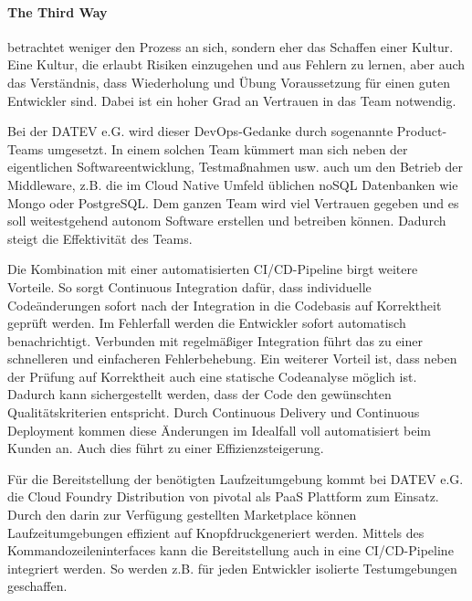 \paragraph{\glqq The Third Way\grqq} betrachtet weniger den Prozess an sich, sondern eher das Schaffen einer Kultur.
Eine Kultur, die erlaubt Risiken einzugehen und aus Fehlern zu lernen, aber auch das Verständnis, dass Wiederholung und Übung Voraussetzung für einen guten Entwickler sind.
Dabei ist ein hoher Grad an Vertrauen in das Team notwendig.

Bei der DATEV e.G. wird dieser DevOps-Gedanke durch sogenannte \glqq Product-Teams\grqq{} umgesetzt.
In einem solchen Team kümmert man sich neben der eigentlichen Softwareentwicklung, Testmaßnahmen usw. auch um den Betrieb der Middleware, z.B. die im Cloud Native Umfeld üblichen noSQL Datenbanken wie Mongo oder PostgreSQL. 
Dem ganzen Team wird viel Vertrauen gegeben und es soll weitestgehend autonom Software erstellen und betreiben können.
Dadurch steigt die Effektivität des Teams.

Die Kombination mit einer automatisierten CI/CD-Pipeline birgt weitere Vorteile.
So sorgt Continuous Integration dafür, dass individuelle Codeänderungen sofort nach der Integration in die Codebasis auf Korrektheit geprüft werden.
Im Fehlerfall werden die Entwickler sofort automatisch benachrichtigt. 
Verbunden mit regelmäßiger Integration führt das zu einer schnelleren und einfacheren Fehlerbehebung.
Ein weiterer Vorteil ist, dass neben der Prüfung auf Korrektheit auch eine statische Codeanalyse möglich ist.
Dadurch kann sichergestellt werden, dass der Code den gewünschten Qualitätskriterien entspricht.
Durch Continuous Delivery und Continuous Deployment kommen diese Änderungen im Idealfall voll automatisiert beim Kunden an.
Auch dies führt  zu einer Effizienzsteigerung.

Für die Bereitstellung der benötigten Laufzeitumgebung kommt bei DATEV e.G. die Cloud Foundry Distribution von \glqq pivotal\grqq{} als PaaS Plattform zum Einsatz.
Durch den darin zur Verfügung gestellten \glqq Marketplace\grqq{} können Laufzeitumgebungen effizient \glqq auf Knopfdruck\grqq generiert werden.
Mittels des Kommandozeileninterfaces kann die Bereitstellung auch in eine CI/CD-Pipeline integriert werden.
So werden z.B. für jeden Entwickler isolierte Testumgebungen geschaffen.

